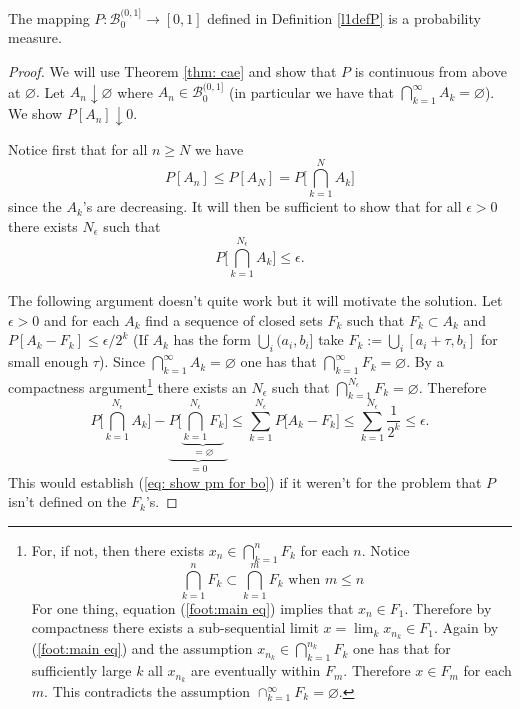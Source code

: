 \begin{theorem}
\label{thm: Borels P is a measure}
 The mapping $P:\mathcal B_0^{(0,1]}\rightarrow [0,1]$ defined in Definition \ref{l1defP} is a probability measure.
 \end{theorem}
\begin{proof}
We will use Theorem \ref{thm: cae} and show that $P$ is continuous from above at $\varnothing.$ Let $A_n \downarrow \varnothing$ where $A_n\in \mathcal B_0^{(0,1]}$ (in particular we have that $\bigcap_{k=1}^\infty A_k =\varnothing$). We show $P[A_n]\downarrow 0$.

Notice first that for all $n\geq N$ we have
\[ P[A_n]\leq P[A_N] =  P\bigl[ \textstyle\bigcap_{k=1}^N A_k\bigr] \]
since the $A_k$'s are decreasing. It will then be sufficient to show that for all $\epsilon>0$ there exists  $N_\epsilon$ such that
\begin{equation}
\label{eq: show pm for bo}
P\bigl[ \textstyle\bigcap_{k=1}^{N_\epsilon} A_k\bigr]\leq \epsilon.
\end{equation}

The following argument doesn't quite work but it will motivate the solution. Let $\epsilon > 0$ and for each $A_k$  find a sequence of closed sets $F_k$ such that $F_k\subset A_k$ and $P[A_k-F_k]\leq \epsilon/2^k$ (If $A_k$ has the form $\bigcup_i (a_i,b_i]$ take $F_k:=\bigcup_i [a_i+\tau,b_i]$ for small enough $\tau$). Since $\bigcap_{k=1}^\infty A_k=\varnothing$ one has that $\bigcap_{k=1}^\infty F_k=\varnothing$.
By a compactness argument\footnote{For, if not, then there exists $x_n\in \bigcap_{k=1}^n F_k$ for each $n$. Notice
\begin{equation}
\label{foot:main eq}
\text{$\bigcap_{k=1}^n F_k\subset \bigcap_{k=1}^m F_k$ when $m\leq n$}
\end{equation}
For one thing, equation (\ref{foot:main eq}) implies that $x_n\in F_1$. Therefore by compactness  there exists a  sub-sequential limit $x=\lim_k x_{n_k} \in F_1$.  Again by (\ref{foot:main eq}) and the assumption  $x_{n_k}\in \bigcap_{k=1}^{n_k} F_k$ one has that for sufficiently large $k$ all  $x_{n_k}$ are eventually within $F_m$. Therefore $x\in F_m$ for each $m$. This contradicts the assumption $\cap_{k=1}^\infty F_k=\varnothing$.  } there exists an $N_\epsilon$ such that $\bigcap_{k=1}^{N_\epsilon} F_k=\varnothing$.
 Therefore
\[
P\bigl[ \textstyle\bigcap_{k=1}^{N_\epsilon} A_k\bigr] - \underbrace{P\bigl[ \underbrace{\textstyle\bigcap_{k=1}^{N_\epsilon} F_k}_{=\varnothing}\bigr]}_{=0}\leq  \sum_{k=1}^{N_\epsilon} P\bigl[A_k-F_k \bigr] \leq \sum_{k=1}^{N_\epsilon} \frac{1}{2^k}\leq \epsilon.
\]
This would establish (\ref{eq: show pm for bo}) if it weren't for the problem that $P$ isn't defined on the $F_k$'s.


\end{proof}

